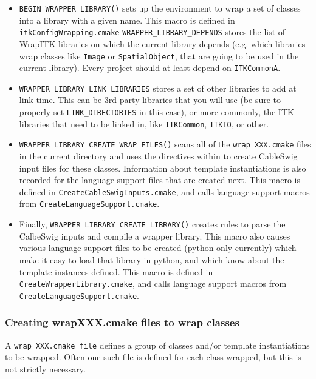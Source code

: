 \documentclass{InsightArticle}
\begin{document}
\begin{itemize}
  \item \verb$BEGIN_WRAPPER_LIBRARY()$ sets up the environment to wrap a set of classes into a
library with a given name. This macro is defined in \verb$itkConfigWrapping.cmake$
\verb$WRAPPER_LIBRARY_DEPENDS$ stores the list of WrapITK libraries on which the
current library depends (e.g. which libraries wrap classes like \verb$Image$ or
\verb$SpatialObject$, that are going to be used in the current library). Every project
should at least depend on \verb$ITKCommonA$.

  \item \verb$WRAPPER_LIBRARY_LINK_LIBRARIES$ stores a set of other libraries to add at link
time. This can be 3rd party libraries that you will use (be sure to properly set
\verb$LINK_DIRECTORIES$ in this case), or more commonly, the ITK libraries that need to
be linked in, like \verb$ITKCommon$, \verb$ITKIO$, or other. 

  \item \verb$WRAPPER_LIBRARY_CREATE_WRAP_FILES()$ scans all of the \verb$wrap_XXX.cmake$ files in the
current directory and uses the directives within to create CableSwig input files
for these classes. Information about template instantiations is also recorded
for the language support files that are created next. This macro is defined in
\verb$CreateCableSwigInputs.cmake$, and calls language support macros from
\verb$CreateLanguageSupport.cmake$.

  \item Finally, \verb$WRAPPER_LIBRARY_CREATE_LIBRARY()$ creates rules to parse the CalbeSwig
inputs and compile a wrapper library. This macro also causes various language
support files to be created (python only currently) which make it easy to load
that library in python, and which know about the template instances defined.
This macro is defined in \verb$CreateWrapperLibrary.cmake$, and calls language support
macros from \verb$CreateLanguageSupport.cmake$.
\end{itemize}


     \subsubsection{Creating wrapXXX.cmake files to wrap classes}

A \verb$wrap_XXX.cmake file$ defines a group of classes and/or template instantiations
to be wrapped. Often one such file is defined for each class wrapped, but this
is not strictly necessary.
\end{document}
